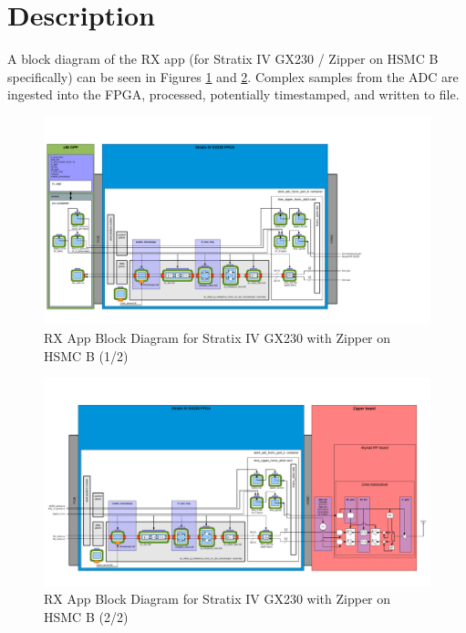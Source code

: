 \documentclass{article}
\begin{document}
\section{Description}
\noindent A block diagram of the RX app (for Stratix IV GX230 / Zipper on HSMC B specifically) can be seen in Figures \ref{fig:rx_app_left} and \ref{fig:rx_app_right}. Complex samples from the ADC are ingested into the FPGA, processed, potentially timestamped, and written to file.
\pagebreak
\begin{landscape}
	\begin{figure}[H]
	 	\centering
		\includegraphics[scale=.750, trim={0 0 6cm 0}]{rx_app_left}
		\caption{RX App Block Diagram for Stratix IV GX230 with Zipper on HSMC B (1/2)}
		\label{fig:rx_app_left}
	\end{figure}
	\begin{figure}[H]
	 	\centering
		\includegraphics[scale=.65, trim={0 0 1cm 0}]{rx_app_right}
		\caption{RX App Block Diagram for Stratix IV GX230 with Zipper on HSMC B (2/2)}
		\label{fig:rx_app_right}
	\end{figure}
\end{landscape}
\end{document}
